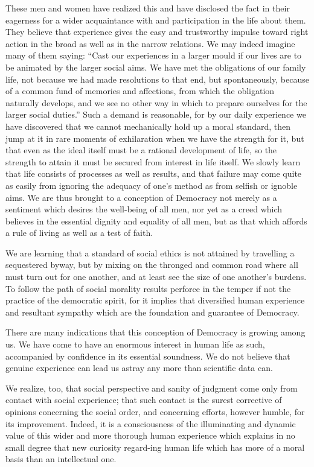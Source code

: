 These men and women have realized this and have disclosed the fact in
their eagerness for a wider acquaintance with and participation in the
life about them. They believe that experience gives the easy and
trustworthy impulse toward right action in the broad as well as in the
narrow relations. We may indeed imagine many of them saying: ``Cast
our experiences in a larger mould if our lives are to be animated by
the larger social aims. We have met the obligations of our family
life, not because we had made resolutions to that end, but
spontaneously, because of a common fund of memories and affections,
from which the obligation naturally develops, and we see no other way
in which to prepare ourselves for the larger social duties.'' Such a
demand is reasonable, for by our daily experience we have 
discovered that we cannot mechanically hold up a moral standard, then
jump at it in rare moments of exhilaration when we have the strength
for it, but that even as the ideal itself must be a rational
development of life, so the strength to attain it must be secured from
interest in life itself. We slowly learn that life consists of
processes as well as results, and that failure may come quite as
easily from ignoring the adequacy of one's method as from selfish or
ignoble aims. We are thus brought to a conception of Democracy not
merely as a sentiment which desires the well-being of all men, nor yet
as a creed which believes in the essential dignity and equality of all
men, but as that which affords a rule of living as well as a test of
faith.

We are learning that a standard of social ethics is not attained by
travelling a sequestered byway, but by mixing on the thronged and
common road where all must turn out for one another, and at least see
the size of one another's burdens. To follow the path  of
social morality results perforce in the temper if not the practice of
the democratic spirit, for it implies that diversified human
experience and resultant sympathy which are the foundation and
guarantee of Democracy.

There are many indications that this conception of Democracy is
growing among us. We have come to have an enormous interest in human
life as such, accompanied by confidence in its essential soundness. We
do not believe that genuine experience can lead us astray any more
than scientific data can.

We realize, too, that social perspective and sanity of judgment come
only from contact with social experience; that such contact is the
surest corrective of opinions concerning the social order, and
concerning efforts, however humble, for its improvement. Indeed, it is
a consciousness of the illuminating and dynamic value of this wider
and more thorough human experience which explains in no small degree
that new curiosity regard-ing human life which has more of a
moral basis than an intellectual one.

